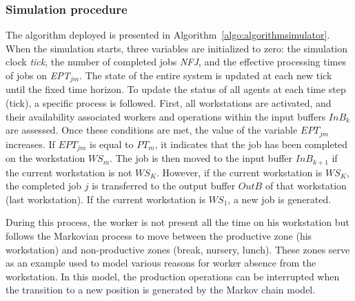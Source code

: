\documentclass[review,12pt, 3p, times]{elsarticle}
\begin{document}
\subsubsection{Simulation procedure}
The algorithm deployed is presented in Algorithm~\ref{algo:algorithmsimulator}. When the simulation starts, three variables are initialized to zero: the simulation clock \textit{tick}, the number of completed jobs \textit{NFJ}, and the effective processing times of jobs on  \textit{EPT}$_{jm}$. The state of the entire system is updated at each new tick until the  fixed time horizon. To update the status of all agents at each time step (tick), a specific process is followed.
First, all workstations are activated, and their availability  associated workers and operations within the input buffers $InB_{k}$ are assessed. Once these conditions are met, the value of the variable $EPT_{jm}$ increases. If $EPT_{jm}$ is equal to $PT_{m}$, it indicates that the job has been completed on the workstation $\textit{WS}_m$. The job is then moved to the input buffer $InB_{k+1}$ if the current workstation is not $\textit{WS}_K$. However, if the current workstation is $\textit{WS}_K$, the completed job $j$ is transferred to the output buffer $OutB$ of that workstation (last workstation). If the current workstation is $\textit{WS}_1$, a new job is generated. 

During this process, the worker is not present all the time on his workstation but follows the Markovian process to move between the productive zone (his workstation) and non-productive zones (break, nursery, lunch). These zones serve as an example used to model various reasons for worker absence from the workstation.  In this model, the production operations can be interrupted when the transition to a new position is generated by the Markov chain model.
\end{document}
